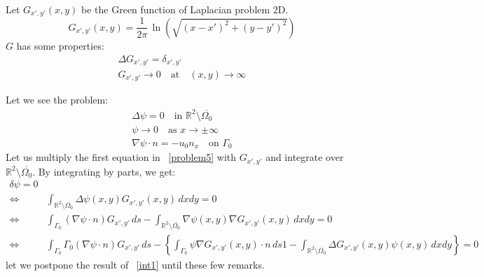 \documentclass[a4paper,12pt]{article}
\newcommand{\integ}[3]{%
\ensuremath{\displaystyle{\int^{#2}_{#1} #3}}}
\begin{document}
Let $G_{x',y'} (x,y)$ be the Green function of Laplacian problem 2D.
\begin{equation}
 G_{x',y'}(x,y)=\dfrac{1}{2 \pi} \, \ln(\sqrt{(x-x')^2+(y-y')^2})
\end{equation}
$G$ has some properties:
\begin{align}
 \Delta G_{x',y'}=\delta_{x',y'}\\
 G_{x',y'}\to0\quad \text{at}\quad (x,y)\to\infty
\end{align}

Let we see the problem:
\begin{align}  \label{problem5}
\Delta \psi=0 \quad \text{in } \mathbb{R}^2 \setminus \overline{\Omega_0}\\
\psi \to 0 \quad \text{as } x\to\pm\infty\\
\nabla\psi \cdot n = -u_0 n_x \quad \text{on } \Gamma_0 
\end{align}
Let us multiply the first equation in ~\eqref{problem5} with $G_{x',y'}$ and integrate over 
$\mathbb{R}^2 \setminus \overline{\Omega_0}$. By integrating by parts, we get:
\begin{align}
\delta\psi=0\\
\Leftrightarrow&\integ{\mathbb{R}^2 \setminus \overline{\Omega_0}}{}{ \Delta \psi(x,y) G_{x',y'}(x,y) \, dxdy}=0\\
\Leftrightarrow& \integ{\Gamma_0}{}{(\nabla \psi \cdot n)G_{x',y'} \, ds}-\integ{\mathbb{R}^2 \setminus \overline{\Omega_0}}{}
{\nabla\psi (x,y) \nabla G_{x',y'}(x,y) \, dxdy}=0\\
\Leftrightarrow&\integ{\Gamma_0}{}{\Gamma_0}{}{(\nabla \psi \cdot n)G_{x',y'} \, ds}-
\left\{\integ{\Gamma_0}{}{\psi \nabla G_{x',y'}(x,y)\cdot n \, ds1}-
\integ{\mathbb{R}^2 \setminus \overline{\Omega_0}}{}{\Delta G_{x',y'}(x,y) \psi (x,y) \, dxdy}\right\}=0 \label{int1}
\end{align}
let we postpone the result of ~\eqref{int1} until these few remarks.
\end{document}

